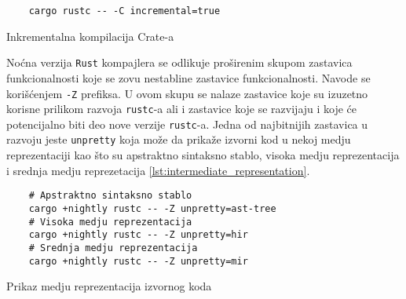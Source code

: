 \begin{listing}[H]
\begin{verbatim}
    cargo rustc -- -C incremental=true 
\end{verbatim}
\caption{Inkrementalna kompilacija Crate-a}
\label{lst:incremental_flag}
\end{listing}


Noćna verzija \verb|Rust| kompajlera se odlikuje proširenim skupom zastavica funkcionalnosti koje se zovu 
nestabline zastavice funkcionalnosti. Navode se korišćenjem \verb|-Z| prefiksa. U ovom skupu se nalaze 
zastavice koje su izuzetno korisne prilikom razvoja \verb|rustc|-a ali i zastavice koje se razvijaju
i koje će potencijalno biti deo nove verzije \verb|rustc|-a. Jedna od najbitnijih zastavica u razvoju 
jeste \verb|unpretty| koja može da prikaže izvorni kod u nekoj medju reprezentaciji kao što su
apstraktno sintaksno stablo, visoka medju reprezentacija i srednja medju reprezetacija \ref{lst:intermediate_representation}.

\begin{listing}[H]
\begin{verbatim}
    # Apstraktno sintaksno stablo 
    cargo +nightly rustc -- -Z unpretty=ast-tree
    # Visoka medju reprezentacija
    cargo +nightly rustc -- -Z unpretty=hir
    # Srednja medju reprezentacija
    cargo +nightly rustc -- -Z unpretty=mir
\end{verbatim}
\caption{Prikaz medju reprezentacija izvornog koda}
\label{lst:intermediate_representation}
\end{listing}